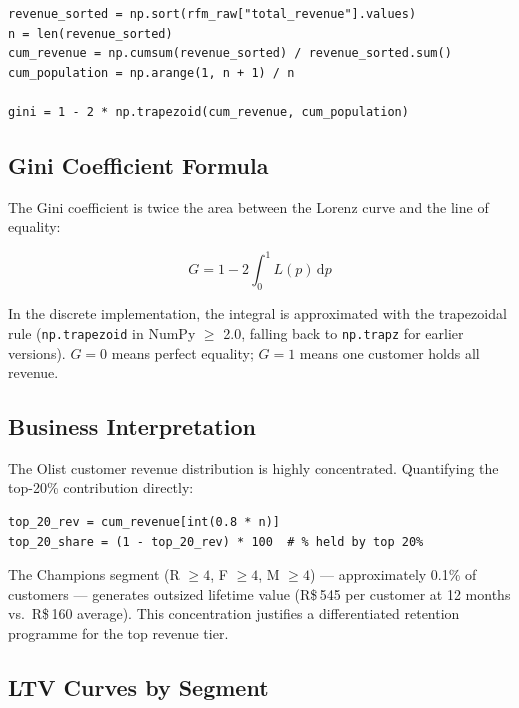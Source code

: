 \begin{lstlisting}[style=python, caption={Lorenz curve and Gini calculation (\filepath{streamlit/pages/3\_segmentos\_clientes.py}, lines~329--335)}]
revenue_sorted = np.sort(rfm_raw["total_revenue"].values)
n = len(revenue_sorted)
cum_revenue = np.cumsum(revenue_sorted) / revenue_sorted.sum()
cum_population = np.arange(1, n + 1) / n

gini = 1 - 2 * np.trapezoid(cum_revenue, cum_population)
\end{lstlisting}

\subsection{Gini Coefficient Formula}

The Gini coefficient is twice the area between the Lorenz curve and the
line of equality:

\begin{equation}
G = 1 - 2 \int_0^1 L(p)\,\mathrm{d}p
\label{eq:gini}
\end{equation}

In the discrete implementation, the integral is approximated with the trapezoidal
rule (\texttt{np.trapezoid} in NumPy $\geq$ 2.0, falling back to \texttt{np.trapz}
for earlier versions). $G = 0$ means perfect equality; $G = 1$ means one customer
holds all revenue.

\subsection{Business Interpretation}

The Olist customer revenue distribution is highly concentrated. Quantifying the
top-20\% contribution directly:

\begin{lstlisting}[style=python, caption={Top-20\% revenue share calculation}]
top_20_rev = cum_revenue[int(0.8 * n)]
top_20_share = (1 - top_20_rev) * 100  # % held by top 20%
\end{lstlisting}

The Champions segment (R $\geq 4$, F $\geq 4$, M $\geq 4$) --- approximately
0.1\% of customers --- generates outsized lifetime value (R\$\,545 per customer
at 12 months vs.\ R\$\,160 average). This concentration justifies a differentiated
retention programme for the top revenue tier.

\subsection{LTV Curves by Segment}


